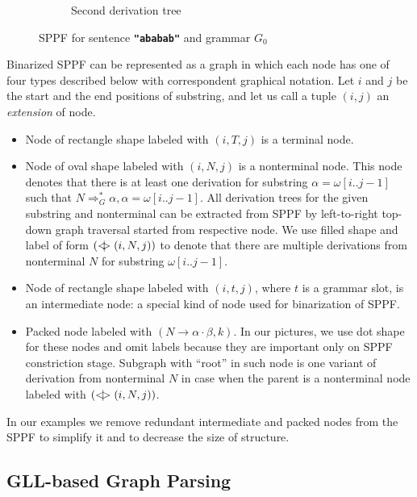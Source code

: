 \begin{figure}[ht]
\begin{center}
\begin{subfigure}[b]{0.3\textwidth}
        \caption{Second derivation tree}
        \label{tree2}        
    \end{subfigure}
    \caption{SPPF for sentence \textbf{\texttt{"ababab"}} and grammar $G_0$}
    \label{sppfSample}
    \end{center}                
\end{figure}

Binarized SPPF can be represented as a graph in which each node has one of four types described below with correspondent graphical notation.
Let $i$ and $j$ be the start and the end positions of substring, and let us call a tuple $(i,j)$ an \textit{extension} of node.

\begin{itemize}
    \item Node of rectangle shape labeled with $(i, T, j)$ is a terminal node.     
    \item Node of oval shape labeled with $(i, N, j)$ is a nonterminal node. 
    This node denotes that there is at least one derivation for substring $\alpha=\omega[i..j-1]$ such that $N \Rightarrow^*_G \alpha, \alpha = \omega[i..j-1] $.
    All derivation trees for the given substring and nonterminal can be extracted from SPPF by left-to-right top-down graph traversal started from respective node. 
    We use filled shape and label of form $(<\mkern-11mu | \mkern-11mu> (i, N, j))$ to denote that there are multiple derivations from nonterminal $N$ for substring $\omega[i..j-1]$.
    \item Node of rectangle shape labeled with $(i,t,j)$, where $t$ is a grammar slot, is an intermediate node: a special kind of node used for binarization of SPPF.
    \item Packed node labeled with $(N \rightarrow \alpha \cdot \beta, k)$. In our pictures, we use dot shape for these nodes and omit labels because they are important only on SPPF constriction stage.
    Subgraph with ``root'' in such node is one variant of derivation from nonterminal $N$ in case when the parent is a nonterminal node labeled with $(<\mkern-9mu | \mkern-9mu> (i, N, j))$.

\end{itemize}

In our examples we remove redundant intermediate and packed nodes from the SPPF to simplify it and to decrease the size of structure.

\subsection{GLL-based Graph Parsing}

